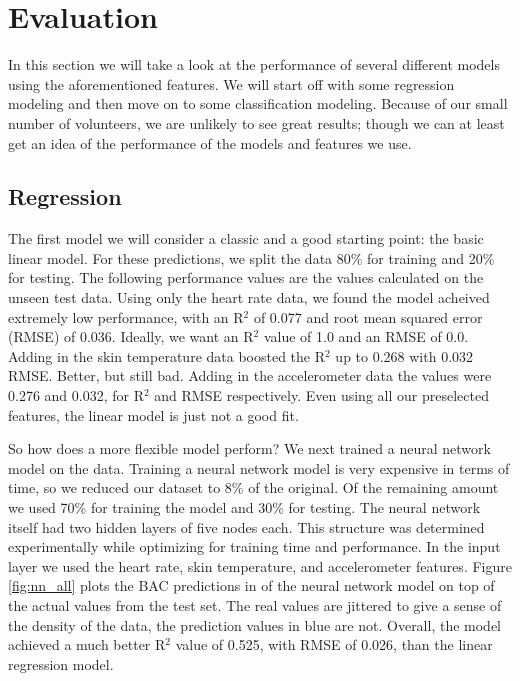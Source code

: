\section{Evaluation}

In this section we will take a look at the performance of several different models using the aforementioned features. We will start off with some regression modeling and then move on to some classification modeling. Because of our small number of volunteers, we are unlikely to see great results; though we can at least get an idea of the performance of the models and features we use.

\subsection{Regression}

The first model we will consider a classic and a good starting point: the basic linear model. For these predictions, we split the data 80\% for training and 20\% for testing. The following performance values are the values calculated on the unseen test data. Using only the heart rate data, we found the model acheived extremely low performance, with an R$^2$ of 0.077 and root mean squared error (RMSE) of 0.036. Ideally, we want an R$^2$ value of 1.0 and an RMSE of 0.0. Adding in the skin temperature data boosted the R$^2$ up to 0.268 with 0.032 RMSE. Better, but still bad. Adding in the accelerometer data the values were 0.276 and 0.032, for R$^2$ and RMSE respectively. Even using all our preselected features, the linear model is just not a good fit.

So how does a more flexible model perform? We next trained a neural network model on the data. Training a neural network model is very expensive in terms of time, so we reduced our dataset to 8\% of the original. Of the remaining amount we used 70\% for training the model and 30\% for testing. The neural network itself had two hidden layers of five nodes each. This structure was determined experimentally while optimizing for training time and performance. In the input layer we used the heart rate, skin temperature, and accelerometer features. Figure \ref{fig:nn_all} plots the BAC predictions in of the neural network model on top of the actual values from the test set. The real values are jittered to give a sense of the density of the data, the prediction values in blue are not. Overall, the model achieved a much better R$^2$ value of 0.525, with RMSE of 0.026, than the linear regression model.

